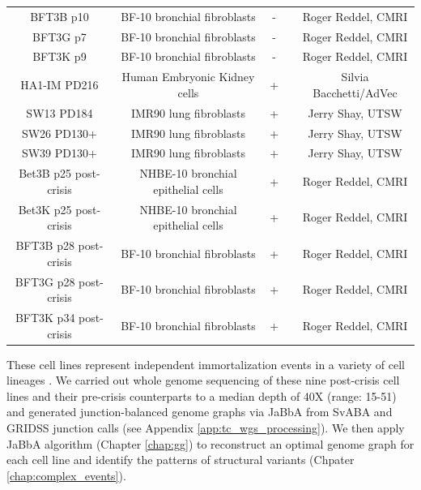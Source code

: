 \documentclass[phd,tocprelim]{cornell}
\begin{document}
\begin{table}[ht]
\begin{adjustbox}
\begin{tabular}{ccccc}
            BFT3B p10             & BF-10 bronchial   fibroblasts        & -            & \cite{Bryan1995-ik}    & Roger Reddel, CMRI       \\
            BFT3G p7              & BF-10 bronchial   fibroblasts        & -            & \cite{Bryan1995-ik}  & Roger Reddel, CMRI       \\
            BFT3K p9              & BF-10 bronchial   fibroblasts        & -            & \cite{Bryan1995-ik}    & Roger Reddel, CMRI       \\
            HA1-IM PD216          & Human Embryonic   Kidney cells       & + & \cite{Counter1992-yg}  & Silvia   Bacchetti/AdVec \\
            SW13 PD184            & IMR90 lung   fibroblasts             & +  & \cite{Shay1989-ua} & Jerry Shay, UTSW         \\
            SW26 PD130+           & IMR90 lung   fibroblasts             & +  & \cite{Shay1989-ua} & Jerry Shay, UTSW         \\
            SW39 PD130+           & IMR90 lung   fibroblasts             & +  & \cite{Shay1989-ua} & Jerry Shay, UTSW         \\
            Bet3B p25 post-crisis & NHBE-10 bronchial   epithelial cells & + & \cite{Bryan1995-ik}      & Roger Reddel, CMRI       \\
            Bet3K p25 post-crisis & NHBE-10 bronchial   epithelial cells & + & \cite{Bryan1995-ik}      & Roger Reddel, CMRI       \\
            BFT3B p28 post-crisis & BF-10 bronchial   fibroblasts        & + & \cite{Bryan1995-ik}      & Roger Reddel, CMRI       \\
            BFT3G p28 post-crisis & BF-10 bronchial   fibroblasts        & + & \cite{Bryan1995-ik}      & Roger Reddel, CMRI       \\
            BFT3K p34 post-crisis & BF-10 bronchial   fibroblasts        & + & \cite{Bryan1995-ik}      & Roger Reddel, CMRI       \\ \hline
        \end{tabular}
    \end{adjustbox}
\end{table}
\clearpage

These cell lines represent independent immortalization events in a variety of cell lineages \cite{Bryan1995-ik,Shay1989-ua,Counter1992-yg}. We carried out whole genome sequencing of these nine post-crisis cell lines and their pre-crisis counterparts to a median depth of 40X (range: 15-51) and generated junction-balanced genome graphs\cite{Hadi2020-um} via JaBbA from SvABA\cite{Wala2018-qa} and GRIDSS\cite{Cameron2021-db} junction calls (see Appendix \ref{app:tc_wgs_processing}). We then apply JaBbA algorithm (Chapter \ref{chap:gg}) to reconstruct an optimal genome graph for each cell line and identify the patterns of structural variants (Chpater \ref{chap:complex_events}).
\end{document}
